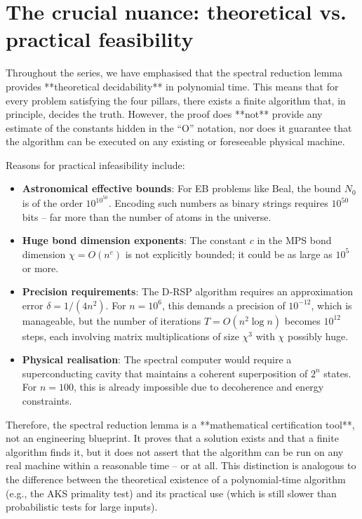 \documentclass[11pt,a4paper]{article}
\begin{document}
\section{The crucial nuance: theoretical vs. practical feasibility}

Throughout the series, we have emphasised that the spectral reduction lemma provides **theoretical decidability** in polynomial time. This means that for every problem satisfying the four pillars, there exists a finite algorithm that, in principle, decides the truth. However, the proof does **not** provide any estimate of the constants hidden in the “O” notation, nor does it guarantee that the algorithm can be executed on any existing or foreseeable physical machine.

Reasons for practical infeasibility include:
\begin{itemize}
\item \textbf{Astronomical effective bounds}: For EB problems like Beal, the bound \(N_0\) is of the order \(10^{10^{50}}\). Encoding such numbers as binary strings requires \(10^{50}\) bits – far more than the number of atoms in the universe.
\item \textbf{Huge bond dimension exponents}: The constant \(c\) in the MPS bond dimension \(\chi = O(n^c)\) is not explicitly bounded; it could be as large as \(10^5\) or more.
\item \textbf{Precision requirements}: The D‑RSP algorithm requires an approximation error \(\delta = 1/(4n^2)\). For \(n = 10^6\), this demands a precision of \(10^{-12}\), which is manageable, but the number of iterations \(T = O(n^2 \log n)\) becomes \(10^{12}\) steps, each involving matrix multiplications of size \(\chi^3\) with \(\chi\) possibly huge.
\item \textbf{Physical realisation}: The spectral computer would require a superconducting cavity that maintains a coherent superposition of \(2^n\) states. For \(n = 100\), this is already impossible due to decoherence and energy constraints.
\end{itemize}

Therefore, the spectral reduction lemma is a **mathematical certification tool**, not an engineering blueprint. It proves that a solution exists and that a finite algorithm finds it, but it does not assert that the algorithm can be run on any real machine within a reasonable time – or at all. This distinction is analogous to the difference between the theoretical existence of a polynomial‑time algorithm (e.g., the AKS primality test) and its practical use (which is still slower than probabilistic tests for large inputs).
\end{document}
